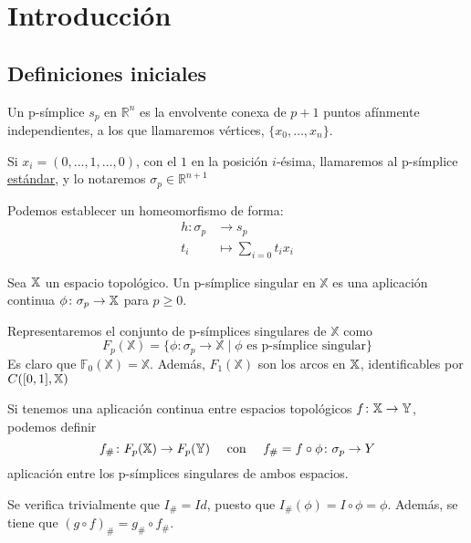 \chapter{Introducción}\label{ch:introduccion}

\section{Definiciones iniciales}

\begin{definition}
Un p-símplice $s_p$ en $\mathbb{R}^n$ es la envolvente conexa de $p+1$ puntos afínmente independientes, a los que llamaremos vértices, $\{x_0, \dots, x_n\}$.
\end{definition}
Si $x_i = (0, \dots, 1, \dots, 0)$, con el $1$ en la posición $i$-ésima, llamaremos al p-símplice \underline{estándar},
y lo notaremos ${\sigma_p \in \mathbb{R}^{n+1}}$

Podemos establecer un homeomorfismo de forma:
\begin{align*}
  h \colon \sigma_p &\to s_p  \\
  t_i &\mapsto \sum_{i=0} t_i x_i
\end{align*}

\begin{definition}
Sea ${\mathbb X}$ un espacio topológico. Un p-símplice singular en $\mathbb{X}$ es una aplicación continua $\phi \colon \sigma_p \to {\mathbb X}$ para $p \geq 0$.
\end{definition}

Representaremos el conjunto de p-símplices singulares de $\mathbb{X}$ como
\[F_p(\mathbb{X}) = \{\phi \colon \sigma_p \to \mathbb{X} \mid \phi \text{ es p-símplice singular}\}\]
Es claro que $\mathbb{F}_0(\mathbb{X}) = \mathbb{X}$. Además, $F_1(\mathbb{X})$ son los arcos en ${\mathbb X}$, identificables por
$\mathbb \mathcal{C}([0,1], {\mathbb X})$

Si tenemos una aplicación continua entre espacios topológicos $f \colon {\mathbb X} \to {\mathbb Y}$, podemos definir
\[f_{\#} \colon F_{p}({\mathbb X}) \to F_{p}({\mathbb Y})  \quad \text{ con }  \quad f_{\#} = f \circ \phi \colon \sigma_p \to Y \]
aplicación entre los p-símplices singulares de ambos espacios.

Se verifica trivialmente que $I_\# = Id$, puesto que $I_\#(\phi) = I \circ \phi = \phi$.
Además, se tiene que $(g \circ f)_\# = g_\# \circ f_\#$.

